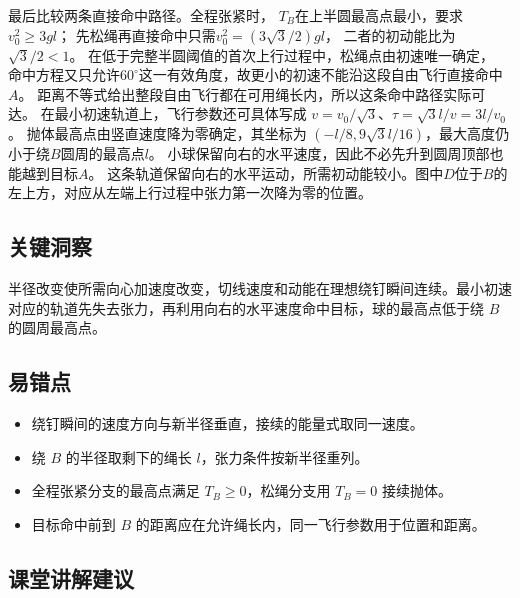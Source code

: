 \documentclass[UTF8,fontset=fandol,a4paper,11pt]{ctexart}
\begin{document}
最后比较两条直接命中路径。全程张紧时，
$T_B$在上半圆最高点最小，要求$v_0^2\geq3gl$；
先松绳再直接命中只需$v_0^2=(3\sqrt3/2)gl$，
二者的初动能比为$\sqrt3/2<1$。
在低于完整半圆阈值的首次上行过程中，松绳点由初速唯一确定，
命中方程又只允许$60^\circ$这一有效角度，故更小的初速不能沿这段自由飞行直接命中$A$。
距离不等式给出整段自由飞行都在可用绳长内，所以这条命中路径实际可达。
在最小初速轨道上，飞行参数还可具体写成
$v=v_0/\sqrt3$、$\tau=\sqrt3l/v=3l/v_0$。
抛体最高点由竖直速度降为零确定，其坐标为
$(-l/8,9\sqrt3l/16)$，最大高度仍小于绕$B$圆周的最高点$l$。
小球保留向右的水平速度，因此不必先升到圆周顶部也能越到目标$A$。
这条轨道保留向右的水平运动，所需初动能较小。图中$D$位于$B$的左上方，对应从左端上行过程中张力第一次降为零的位置。





\subsection*{关键洞察}

半径改变使所需向心加速度改变，切线速度和动能在理想绕钉瞬间连续。最小初速对应的轨道先失去张力，再利用向右的水平速度命中目标，球的最高点低于绕 $B$ 的圆周最高点。



\subsection*{易错点}

\begin{itemize}
\item 绕钉瞬间的速度方向与新半径垂直，接续的能量式取同一速度。
\item 绕 $B$ 的半径取剩下的绳长 $l$，张力条件按新半径重列。
\item 全程张紧分支的最高点满足 $T_B\geq0$，松绳分支用 $T_B=0$ 接续抛体。
\item 目标命中前到 $B$ 的距离应在允许绳长内，同一飞行参数用于位置和距离。
\end{itemize}



\subsection*{课堂讲解建议}
\end{document}
